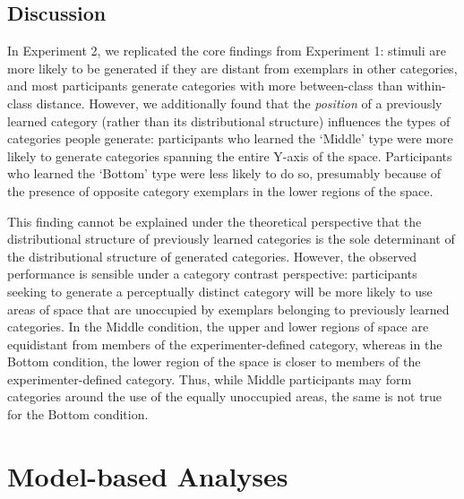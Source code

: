 \documentclass[12pt]{article}
\begin{document}
\begin{flushleft}
\subsection{Discussion}

In Experiment 2, we replicated the core findings from Experiment 1: stimuli are more likely to be generated if they are distant from exemplars in other categories, and most participants generate categories with more between-class than within-class distance. However, we additionally found that the \textit{position} of a previously learned category (rather than its distributional structure) influences the types of categories people generate: participants who learned the `Middle' type were more likely to generate categories spanning the entire Y-axis of the space. Participants who learned the `Bottom' type were less likely to do so, presumably because of the presence of opposite category exemplars in the lower regions of the space.

This finding cannot be explained under the theoretical perspective that the distributional structure of previously learned categories is the sole determinant of the distributional structure of generated categories. However, the observed performance is sensible under a category contrast perspective: participants seeking to generate a perceptually distinct category will be more likely to use areas of space that are unoccupied by exemplars belonging to previously learned categories. In the Middle condition, the upper and lower regions of space are equidistant from members of the experimenter-defined category, whereas in the Bottom condition, the lower region of the space is closer to members of the experimenter-defined category. Thus, while Middle participants may form categories around the use of the equally unoccupied areas, the same is not true for the Bottom condition.

\section{Model-based Analyses}


\end{flushleft}
\end{document}
